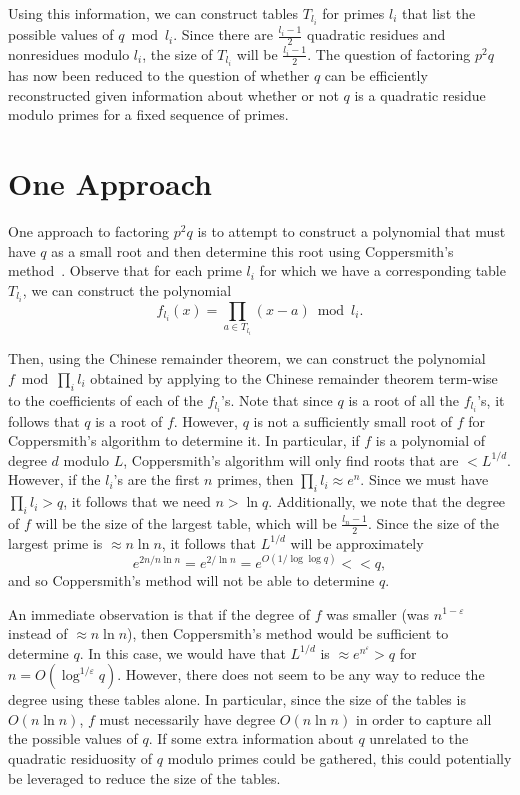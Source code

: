 \documentclass[letterpaper,twocolumn,10pt]{article}
\begin{document}
Using this information, we can construct tables $T_{l_i}$ for primes $l_i$ that list the possible values of $q \bmod l_i$. Since there are $\frac{l_i - 1}{2}$ quadratic residues and nonresidues modulo $l_i$, the size of $T_{l_i}$ will be $\frac{l_i - 1}{2}$. The question of factoring $p^2 q$ has now been reduced to the question of whether $q$ can be efficiently reconstructed given information about whether or not $q$ is a quadratic residue modulo primes for a fixed sequence of primes. 

\section{One Approach}

One approach to factoring $p^2 q$ is to attempt to construct a polynomial that must have $q$ as a small root and then determine this root using Coppersmith's method~\cite{Coppersmith}. Observe that for each prime $l_i$ for which we have a corresponding table $T_{l_i}$, we can construct the polynomial
\[
f_{l_i}(x) = \prod_{a \in T_{l_i}} (x - a) \bmod l_i.
\]

Then, using the Chinese remainder theorem, we can construct the polynomial $f \bmod \prod_i l_i$ obtained by applying to the Chinese remainder theorem term-wise to the coefficients of each of the $f_{l_i}$'s. Note that since $q$ is a root of all the $f_{l_i}$'s, it follows that $q$ is a root of $f$. However, $q$ is not a sufficiently small root of $f$ for Coppersmith's algorithm to determine it. In particular, if $f$ is a polynomial of degree $d$ modulo $L$, Coppersmith's algorithm will only find roots that are $< L^{1/d}$. However, if the $l_i$'s are the first $n$ primes, then $\prod_i l_i \approx e^n$. Since we must have $\prod_i l_i > q$, it follows that we need $n > \ln q$. Additionally, we note that the degree of $f$ will be the size of the largest table, which will be $\frac{l_n - 1}{2}$. Since the size of the largest prime is $\approx n \ln n$, it follows that $L^{1/d}$ will be approximately
\[
e^{2n/n\ln n} = e^{2/\ln n} = e^{O(1/\log \log q)}  << q,
\]  
and so Coppersmith's method will not be able to determine $q$.

An immediate observation is that if the degree of $f$ was smaller (was $n^{1 - \varepsilon}$ instead of $\approx n \ln n$), then Coppersmith's method would be sufficient to determine $q$. In this case, we would have that $L^{1/d}$ is $\approx e^{n^{\varepsilon}} > q$ for $n = O(\log^{1/\varepsilon} q)$. However, there does not seem to be any way to reduce the degree using these tables alone. In particular, since the size of the tables is $O(n \ln n)$, $f$ must necessarily have degree $O(n \ln n)$ in order to capture all the possible values of $q$. If some extra information about $q$ unrelated to the quadratic residuosity of $q$ modulo primes could be gathered, this could potentially be leveraged to reduce the size of the tables. 
\end{document}
